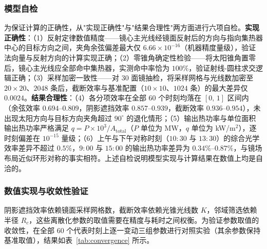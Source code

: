\documentclass[12pt,a4paper,fontset=fandol]{ctexart}
\begin{document}
\subsubsection{模型自检}

为保证计算的正确性，从"实现正确性"与"结果合理性"两方面进行六项自检。\textbf{实现正确性}：（1）反射定律数值精度——镜心主光线经镜面反射后的方向与指向集热器中心的目标方向之间，夹角余弦偏差最大仅 $6.66 \times 10^{-16}$（机器精度量级），验证法向量与反射方向的计算实现正确；（2）零锥角确定性检验——将太阳锥角置零后，镜心主光线应全部命中集热器，实测命中率恰为 $100\%$，验证射线-圆柱求交逻辑正确；（3）采样加密一致性——对 30 面镜抽检，将采样网格与光线数加密至 $20\times20$、$2048$ 条后，截断效率与基准配置（$10\times10$、$1024$ 条）的最大差异仅 $0.0024$。\textbf{结果合理性}：（4）各分项效率在全部 $60$ 个时刻均落在 $[0,\,1]$ 区间内（余弦效率 $0.694$--$0.809$，阴影遮挡效率 $0.857$--$0.939$，截断效率 $0.936$--$0.954$），未出现太阳方向与目标方向夹角超过 $90^{\circ}$ 的退化情形；（5）输出热功率与单位面积输出热功率严格满足 $q = P \times 10^{3} / A_{\mathrm{total}}$（$P$ 单位为 MW，$q$ 单位为 kW/m$^{2}$），逐时刻偏差在 $10^{-15}$ 量级；（6）上午与下午对称时刻（$10{:}30$ 与 $13{:}30$）的综合光学效率差异不超过 $0.5\%$，$9{:}00$ 与 $15{:}00$ 的输出热功率差异为 $0.34\%$--$0.87\%$，与镜场布局近似环形对称的事实相符。上述自检说明模型实现与计算结果在数值上均是自洽的。

\subsubsection{数值实现与收敛性验证}

阴影遮挡效率依赖镜面采样网格数，截断效率依赖光锥光线数 $K$，邻域筛选依赖半径 $R_c$，这些离散化参数的取值需要在精度与耗时之间权衡。为验证参数取值的收敛性，在全部 $60$ 个代表时刻上逐一变动三组参数进行对照实验（其余参数保持基准取值），结果如表~\ref{tab:convergence} 所示。
\end{document}
